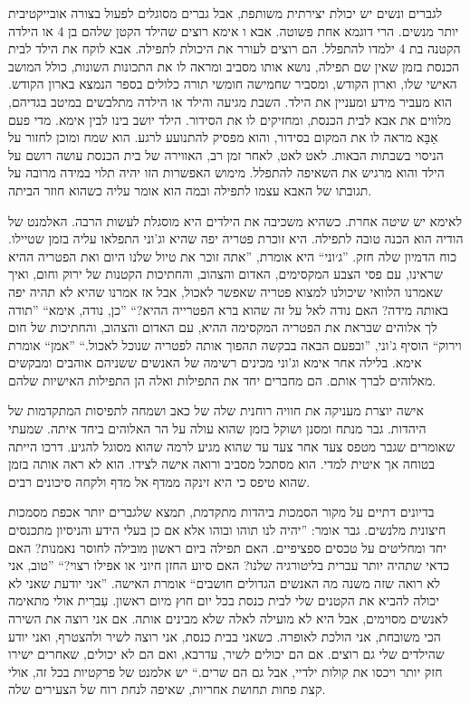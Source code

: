 \documentclass[14pt, article, extrafontsizes, twopage, a4paper]{memoir}
\begin{document}
לגברים ונשים יש יכולת יצירתית משותפת, אבל
גברים מסוגלים לפעול בצורה אובייקטיבית יותר מנשים. הרי
דוגמא אחת פשוטה. אבא ו אימא רוצים שהילד הקטן שלהם
בן 4 או הילדה הקטנה בת 4 ילמדו להתפלל. הם רוצים
לעורר את היכולת לתפילה. אבא לוקח את הילד
לבית הכנסת בזמן שאין שם תפילה, נושא
אותו מסביב ומראה לו את התכונות השונות, כולל המושב האישי שלו,
וארון הקודש, ומסביר שחמישה חומשי תורה
כלולים בספר הנמצא בארון הקודש.
הוא מעביר מידע ומעניין את הילד. השבת
מגיעה והילד או הילדה מתלבשים במיטב בגדיהם,
מלווים את אבא לבית הכנסת, ומחזיקים לו את הסידור.
הילד יושב בינו לבין  אימא.
מדי פעם אַבָּא מראה לו את המקום בסידור, והוא מפסיק
להתנועע לרגע. הוא שמח ומוכן לחזור
על הניסוי בשבתות הבאות. לאט לאט, לאחר
זמן רב, האווירה של בית הכנסת עושה רושם
על הילד והוא מרגיש את השאיפה להתפלל.
מימוש האפשרות הזו יהיה תלוי במידה מרובה
על תגובתו של האבא עצמו לתפילה
ובמה הוא אומר עליה כשהוא חוזר הביתה.

לאימא יש שיטה אחרת. כשהיא משכיבה את הילדים היא מוסגלת לעשות
הרבה. האלמנט של הודיה הוא
הכנה טובה לתפילה. היא זוכרת פטריה יפה
שהיא וג'וני התפלאו עליה בזמן שטיילו.
כוח הדמיון שלה חזק. ''ג׳וני`` היא
אומרת, ''אתה זוכר את טיול שלנו היום ואת הפטריה ההיא
שראינו, עם פסי הצבע המקסימים, האדום והצהוב,
והחתיכות הקטנות של ירוק וחום, ואיך שאמרנו
הלוואי שיכולנו למצוא פטריה שאפשר לאכול, אבל אז אמרנו
שהיא לא תהיה יפה באותה מידה? האם נודה לאל
על זה שהוא ברא הפטרייה ההיא?“ ''כן, נודה,  אימא`` ''תודה לך
אלוהים שבראת את הפטריה המקסימה ההיא, עם האדום והצהוב,
והחתיכות של חום וירוק``  הוסיף ג'וני, ''ובפעם
הבאה בבקשה תהפוך אותה לפטריה שנוכל לאכול.`` ''אמן``
אומרת  אימא. בלילה אחר  אימא וג'וני
מכינים רשימה של האנשים ששניהם אוהבים ומבקשים מאלוהים
לברך אותם. הם מחברים יחד את התפילות ואלה הן
התפילות האישיות שלהם.

אישה יוצרת מעניקה את חוויה רוחנית שלה של
כאב ושמחה לתפיסות המתקדמות של היהדות. 
גבר מנתח ומסנן ושוקל בזמן שהוא
עולה על הר האלוהים ביחד איתה. שמעתי שאומרים שגבר
מטפס צעד אחר צעד עד שהוא מגיע לרמה שהוא מסוגל
להגיע. דרכו הייתה בטוחה אך איטית למדי. הוא מסתכל
מסביב ורואה אישה לצידו. הוא לא ראה אותה
בזמן שהוא טיפס כי היא זינקה ממדף אל
מדף ולקחה סיכונים רבים.

בדיונים דתיים על מקור הסמכות
ביהדות מתקדמת, תמצא שלגברים יותר אכפת
מסמכות חיצונית מלנשים. גבר אומר: ”יהיה לנו
תוהו ובוהו אלא אם כן בעלי הידע והניסיון מתכנסים
יחד ומחליטים על טכסים ספציפיים. האם תפילה ביום ראשון
מובילה לחוסר נאמנות? האם כדאי שתהיה יותר עברית
בליטורגיה שלנו? האם סיוע החזן חיוני או
אפילו רצוי?“ ”טוב, אני לא רואה שזה משנה מה
האנשים הגדולים חושבים“ אומרת האישה. ”אני יודעת שאני לא יכולה להביא
את הקטנים שלי לבית כנסת בכל יום חוץ מיום ראשון. עִברִית
אולי מתאימה לאנשים מסוימים, אבל היא לא מועילה
לאלה שלא מבינים אותה. אם אני רוצה את השירה הכי משובחת,
אני הולכת לאופרה. כשאני בבית כנסת, אני רוצה
לשיר ולהצטרף, ואני יודע שהילדים שלי גם רוצים. אם הם
יכולים לשיר, עדרבא, ואם הם לא יכולים, שאחרים
ישירו חזק יותר ויכסו את קולות ילדיי, אבל גם הם
שרים.“ יש אלמנט של פרקטיות בכל
זה, אולי קצת פחות תחושת אחריות, שאיפה
לנחת רוח של הצעירים שלה.
\end{document}
